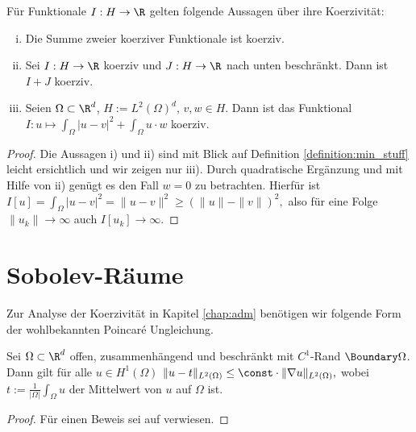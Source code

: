 \documentclass{mythesis}
\begin{document}
\begin{lemma} \label{lem:coercivity}
    Für Funktionale $I: H \to \R$ gelten folgende Aussagen über ihre Koerzivität:
    \begin{enumerate}[i)]
        \item
	   Die Summe zweier koerziver Funktionale ist koerziv.
       \item
	   Sei $I: H \to \R$ koerziv und $J: H \to \R$ nach unten beschränkt.
	   Dann ist $I + J$ koerziv.
       \item
	   Seien $\Omega \subset \R^d$, $H := L^2(\Omega)^d$, $v, w \in H$.
	   Dann ist das Funktional
	   \begin{math}
	       I: u \mapsto \int_\Omega |u - v|^2 + \int_\Omega u \cdot w
	   \end{math}
	   koerziv.
    \end{enumerate}
    \begin{proof}
	Die Aussagen i) und ii) sind mit Blick auf Definition \ref{definition:min_stuff} leicht ersichtlich und wir zeigen nur iii).
	Durch quadratische Ergänzung und mit Hilfe von ii) genügt es den Fall $w = 0$ zu betrachten.
	Hierfür ist
	\begin{math}
	    I[u] = \int_\Omega |u - v|^2 = \|u - v\|^2 \ge (\|u\| - \|v\|)^2,
	\end{math}
	also für eine Folge $\|u_k\| \to \infty$ auch $I[u_k] \to \infty$.
    \end{proof}
\end{lemma}

\section*{Sobolev-Räume}

Zur Analyse der Koerzivität in Kapitel \ref{chap:adm} benötigen wir folgende Form der wohlbekannten Poincaré Ungleichung.

\begin{theorem} \label{thm:poincare-wirtinger}
    Sei $\Omega \subset \R^d$ offen, zusammenhängend und beschränkt mit $C^1$-Rand $\Boundary \Omega$.
    Dann gilt für alle $u \in H^1(\Omega)$
    \begin{math}
	\|u - t\|_{L^2(\Omega)} \le \const \cdot \|\nabla u\|_{L^2(\Omega)},
    \end{math}
    wobei $t := \frac{1}{|\Omega|} \int_\Omega u$ der Mittelwert von $u$ auf $\Omega$ ist.
    \begin{proof}
        Für einen Beweis sei auf \cite[§5.8.1]{evans2010partial} verwiesen.
    \end{proof}
\end{theorem}
\end{document}
